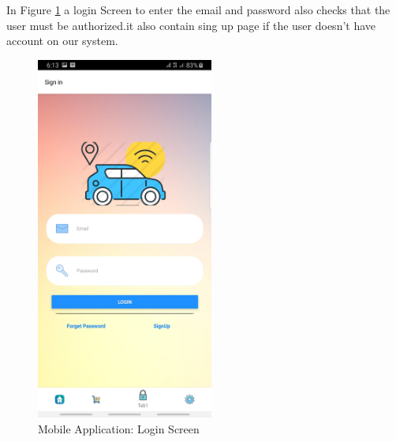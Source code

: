   
In Figure \ref{fig: singin} a login Screen to enter the email and password also checks that the user must be authorized.it also contain sing up page if the user doesn't have account on our system.

\begin{figure}[htp]%
    \center%
    \includegraphics[width=0.52\textwidth]{images/Software/signin.jpg}%
    \caption[Mobile Application: Login Screen]{Mobile Application: Login Screen}\label{fig: singin}%
  \end{figure}
\newpage  


